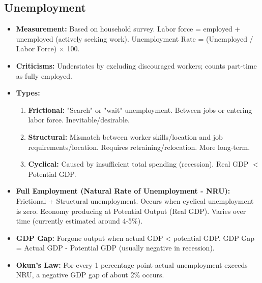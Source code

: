 \documentclass{article}
\begin{document}
\subsection*{Unemployment}
\begin{itemize}
    \item \textbf{Measurement:} Based on household survey. Labor force = employed + unemployed (actively seeking work). Unemployment Rate = (Unemployed / Labor Force) $\times$ 100.
    \item \textbf{Criticisms:} Understates by excluding discouraged workers; counts part-time as fully employed.
    \item \textbf{Types:}
        \begin{enumerate}
            \item \textbf{Frictional:} "Search" or "wait" unemployment. Between jobs or entering labor force. Inevitable/desirable.
            \item \textbf{Structural:} Mismatch between worker skills/location and job requirements/location. Requires retraining/relocation. More long-term.
            \item \textbf{Cyclical:} Caused by insufficient total spending (recession). Real GDP $<$ Potential GDP.
        \end{enumerate}
    \item \textbf{Full Employment (Natural Rate of Unemployment - NRU):} Frictional + Structural unemployment. Occurs when cyclical unemployment is zero. Economy producing at Potential Output (Real GDP). Varies over time (currently estimated around 4-5\%).
    \item \textbf{GDP Gap:} Forgone output when actual GDP < potential GDP. GDP Gap = Actual GDP - Potential GDP (usually negative in recession).
    \item \textbf{Okun's Law:} For every 1 percentage point actual unemployment exceeds NRU, a negative GDP gap of about 2\% occurs.
\end{itemize}
\end{document}
